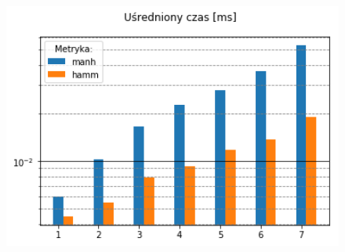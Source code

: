 \documentclass{classrep}
\begin{document}
\begin{figure}[H]
  \centering
    \begin{minipage}{0.45\textwidth}
        \centering
        \includegraphics[width=1.1\textwidth]{output_4_4.png}
    \end{minipage}
\end{figure}

\restoregeometry
\end{document}
